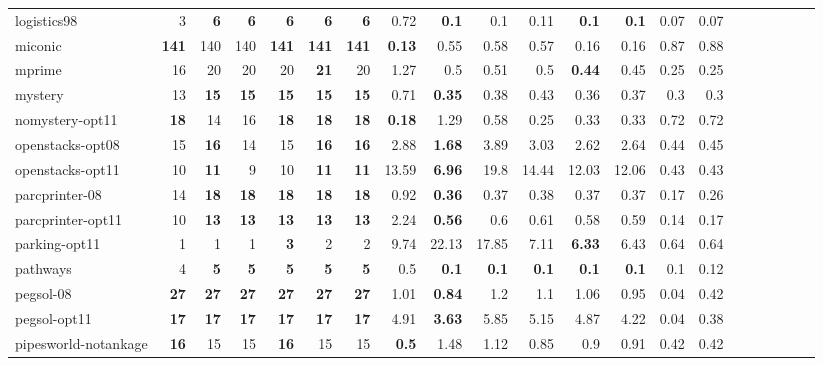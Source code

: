 \begin{table}[h!]
{\begin{tabular}{|l|r|r|r|r|r|r||r|r|r|r|r|r||r|r|r|r|r|r||r|r|}
logistics98 & 3 & \textbf{6} & \textbf{6} & \textbf{6} & \textbf{6} & \textbf{6} & 0.72 & \textbf{0.1} & 0.1 & 0.11 & \textbf{0.1} & \textbf{0.1} & 0.07 & 0.07 \\
miconic & \textbf{141} & 140 & 140 & \textbf{141} & \textbf{141} & \textbf{141} & \textbf{0.13} & 0.55 & 0.58 & 0.57 & 0.16 & 0.16 & 0.87 & 0.88 \\
mprime & 16 & 20 & 20 & 20 & \textbf{21} & 20 & 1.27 & 0.5 & 0.51 & 0.5 & \textbf{0.44} & 0.45 & 0.25 & 0.25 \\
mystery & 13 & \textbf{15} & \textbf{15} & \textbf{15} & \textbf{15} & \textbf{15} & 0.71 & \textbf{0.35} & 0.38 & 0.43 & 0.36 & 0.37 & 0.3 & 0.3 \\
nomystery-opt11 & \textbf{18} & 14 & 16 & \textbf{18} & \textbf{18} & \textbf{18} & \textbf{0.18} & 1.29 & 0.58 & 0.25 & 0.33 & 0.33 & 0.72 & 0.72 \\
openstacks-opt08 & 15 & \textbf{16} & 14 & 15 & \textbf{16} & \textbf{16} & 2.88 & \textbf{1.68} & 3.89 & 3.03 & 2.62 & 2.64 & 0.44 & 0.45 \\
openstacks-opt11 & 10 & \textbf{11} & 9 & 10 & \textbf{11} & \textbf{11} & 13.59 & \textbf{6.96} & 19.8 & 14.44 & 12.03 & 12.06 & 0.43 & 0.43 \\
parcprinter-08 & 14 & \textbf{18} & \textbf{18} & \textbf{18} & \textbf{18} & \textbf{18} & 0.92 & \textbf{0.36} & 0.37 & 0.38 & 0.37 & 0.37 & 0.17 & 0.26 \\
parcprinter-opt11 & 10 & \textbf{13} & \textbf{13} & \textbf{13} & \textbf{13} & \textbf{13} & 2.24 & \textbf{0.56} & 0.6 & 0.61 & 0.58 & 0.59 & 0.14 & 0.17 \\
parking-opt11 & 1 & 1 & 1 & \textbf{3} & 2 & 2 & 9.74 & 22.13 & 17.85 & 7.11 & \textbf{6.33} & 6.43 & 0.64 & 0.64 \\
pathways & 4 & \textbf{5} & \textbf{5} & \textbf{5} & \textbf{5} & \textbf{5} & 0.5 & \textbf{0.1} & \textbf{0.1} & \textbf{0.1} & \textbf{0.1} & \textbf{0.1} & 0.1 & 0.12 \\
pegsol-08 & \textbf{27} & \textbf{27} & \textbf{27} & \textbf{27} & \textbf{27} & \textbf{27} & 1.01 & \textbf{0.84} & 1.2 & 1.1 & 1.06 & 0.95 & 0.04 & 0.42 \\
pegsol-opt11 & \textbf{17} & \textbf{17} & \textbf{17} & \textbf{17} & \textbf{17} & \textbf{17} & 4.91 & \textbf{3.63} & 5.85 & 5.15 & 4.87 & 4.22 & 0.04 & 0.38 \\
pipesworld-notankage & \textbf{16} & 15 & 15 & \textbf{16} & 15 & 15 & \textbf{0.5} & 1.48 & 1.12 & 0.85 & 0.9 & 0.91 & 0.42 & 0.42 \\

\end{tabular}}
\end{table}
